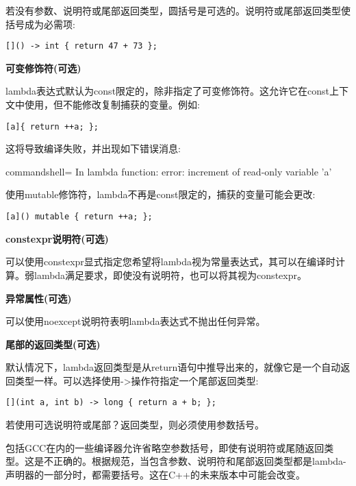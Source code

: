 若没有参数、说明符或尾部返回类型，圆括号是可选的。说明符或尾部返回类型使括号成为必需项:

\begin{lstlisting}[style=styleCXX]
[]() -> int { return 47 + 73 };
\end{lstlisting}

\noindent
\textbf{可变修饰符(可选)}

lambda表达式默认为const限定的，除非指定了可变修饰符。这允许它在const上下文中使用，但不能修改复制捕获的变量。例如:

\begin{lstlisting}[style=styleCXX]
[a]{ return ++a; };
\end{lstlisting}

这将导致编译失败，并出现如下错误消息:

\begin{tcblisting}{commandshell={}}
In lambda function:
error: increment of read-only variable 'a'
\end{tcblisting}

使用mutable修饰符，lambda不再是const限定的，捕获的变量可能会更改:

\begin{lstlisting}[style=styleCXX]
[a]() mutable { return ++a; };
\end{lstlisting}


\noindent
\textbf{constexpr说明符(可选)}

可以使用constexpr显式指定您希望将lambda视为常量表达式，其可以在编译时计算。弱lambda满足要求，即使没有说明符，也可以将其视为constexpr。

\noindent
\textbf{异常属性(可选)}

可以使用noexcept说明符表明lambda表达式不抛出任何异常。

\noindent
\textbf{尾部的返回类型(可选)}

默认情况下，lambda返回类型是从return语句中推导出来的，就像它是一个自动返回类型一样。可以选择使用->操作符指定一个尾部返回类型:

\begin{lstlisting}[style=styleCXX]
[](int a, int b) -> long { return a + b; };
\end{lstlisting}

若使用可选说明符或尾部？返回类型，则必须使用参数括号。

\begin{tcolorbox}[colback=webgreen!5!white,colframe=webgreen!75!black,title=Note]
包括GCC在内的一些编译器允许省略空参数括号，即使有说明符或尾随返回类型。这是不正确的。根据规范，当包含参数、说明符和尾部返回类型都是lambda-声明器的一部分时，都需要括号。这在C++的未来版本中可能会改变。
\end{tcolorbox}














